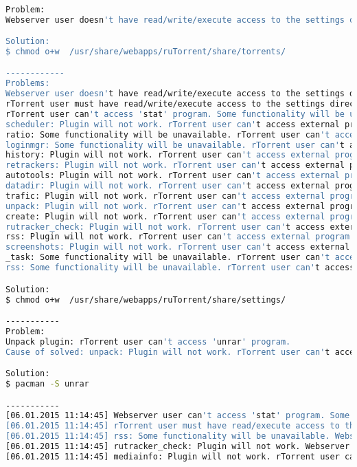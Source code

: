 \begin{lstlisting}[language=bash,caption=Solve ruTorrent troubles]

Problem: 
Webserver user doesn't have read/write/execute access to the settings directory. ruTorrent settings cannot be saved. (/usr/share/webapps/ruTorrent/share/settings)

Solution:
$ chmod o+w  /usr/share/webapps/ruTorrent/share/torrents/

------------
Problems: 
Webserver user doesn't have read/write/execute access to the settings directory. ruTorrent settings cannot be saved. (/usr/share/webapps/ruTorrent/share/settings)
rTorrent user must have read/write/execute access to the settings directory. (/usr/share/webapps/ruTorrent/share/settings)
rTorrent user can't access 'stat' program. Some functionality will be unavailable.
scheduler: Plugin will not work. rTorrent user can't access external program (php).
ratio: Some functionality will be unavailable. rTorrent user can't access external program (php).
loginmgr: Some functionality will be unavailable. rTorrent user can't access external program (php).
history: Plugin will not work. rTorrent user can't access external program (php).
retrackers: Plugin will not work. rTorrent user can't access external program (php).
autotools: Plugin will not work. rTorrent user can't access external program (php).
datadir: Plugin will not work. rTorrent user can't access external program (php).
trafic: Plugin will not work. rTorrent user can't access external program (php).
unpack: Plugin will not work. rTorrent user can't access external program (php).
create: Plugin will not work. rTorrent user can't access external program (php).
rutracker_check: Plugin will not work. rTorrent user can't access external program (php).
rss: Plugin will not work. rTorrent user can't access external program (php).
screenshots: Plugin will not work. rTorrent user can't access external program (ffmpeg).
_task: Some functionality will be unavailable. rTorrent user can't access external program (pgrep).
rss: Some functionality will be unavailable. rTorrent user can't access external program (curl).

Solution:
$ chmod o+w  /usr/share/webapps/ruTorrent/share/settings/

-----------
Problem:
Unpack plugin: rTorrent user can't access 'unrar' program.
Cause of solved: unpack: Plugin will not work. rTorrent user can't access external program (php).

Solution:
$ pacman -S unrar

-----------
[06.01.2015 11:14:45] Webserver user can't access 'stat' program. Some functionality will be unavailable.
[06.01.2015 11:14:45] rTorrent user must have read/execute access to the tmp directory. ruTorrent will not work. (/tmp/)
[06.01.2015 11:14:45] rss: Some functionality will be unavailable. Webserver user can't access external program (curl).
[06.01.2015 11:14:45] rutracker_check: Plugin will not work. Webserver user must have execute access to the rtorrent session directory (/tmp/rtorrent/).
[06.01.2015 11:14:45] mediainfo: Plugin will not work. rTorrent user can't access external program (mediainfo).

\end{lstlisting}


